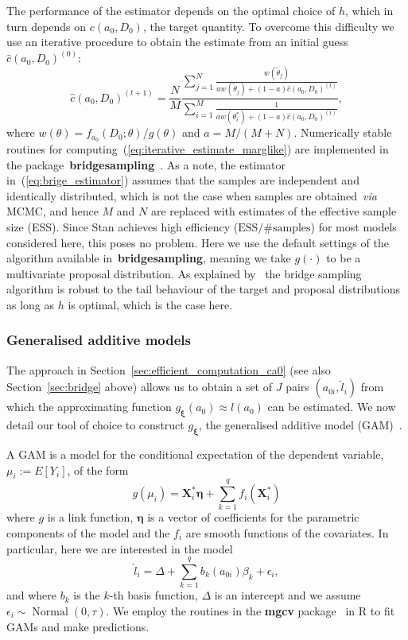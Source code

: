 \documentclass[a4paper, notitlepage, 11pt]{article}
\begin{document}
The performance of the estimator depends on the optimal choice of $h$, which in turn depends on $c(a_0, D_0)$, the target quantity.
To overcome this difficulty we use an iterative procedure to obtain the estimate from an initial guess $\hat{c}(a_0, D_0)^{(0)}$:
\begin{equation}
 \label{eq:iterative_estimate_marglike}
  \hat{c}(a_0, D_0)^{(t + 1)} = \frac{N}{M}\frac{\sum_{j=1}^N \frac{w(\tilde{\theta}_j)}{aw(\tilde{\theta}_j) + (1-a)\hat{c}(a_0, D_0)^{(t)} } }{\sum_{i=1}^M \frac{1}{aw(\theta_i^\ast) + (1-a)\hat{c}(a_0, D_0)^{(t)} }},
\end{equation}
where $w(\theta) = f_{a_0}(D_0; \theta)/g(\theta)$ and $a =  M/(M + N)$.
Numerically stable routines for computing~(\ref{eq:iterative_estimate_marglike}) are implemented in the package~\textbf{bridgesampling}~\citep{Gronau2017}.
As a note, the estimator in~(\ref{eq:brige_estimator}) assumes that the samples are independent and identically distributed, which is not the case when samples are obtained~\textit{via} MCMC, and hence $M$ and $N$ are replaced with estimates of the effective sample size (ESS).
Since Stan achieves high efficiency ($\text{ESS}/\text{\# samples}$) for most models considered here, this poses no problem.
Here we use the default settings of the algorithm available in~\textbf{bridgesampling}, meaning we take $g(\cdot)$ to be a multivariate proposal distribution.
As explained by~\cite{Gronau2017} the bridge sampling algorithm is robust to the tail behaviour of the target and proposal distributions as long as $h$ is optimal, which is the case here.

\subsubsection{Generalised additive models}
\label{sec:gam}

The approach in Section~\ref{sec:efficient_computation_ca0} (see also Section~\ref{sec:bridge} above) allows us to obtain a set of $J$ pairs $(a_{0i}, \hat{l}_i)$ from which the approximating function $g_{\boldsymbol{\xi}}(a_0) \approx l(a_0)$ can be estimated. 
We now detail our tool of choice to construct $g_{\boldsymbol{\xi}}$, the generalised additive model (GAM)~\citep{Wood2017}.

A GAM is a model for the conditional expectation of the dependent variable, $\mu_i := E[Y_i]$, of the form
\begin{equation}
 g(\mu_i) = \boldsymbol{X}_i^\ast\boldsymbol{\eta} + \sum_{k = 1}^q f_i(\boldsymbol{X}_i^\ast)
\end{equation}
where $g$ is a link function, $\boldsymbol{\eta}$ is a vector of coefficients for the parametric components of the model and the $f_i$ are smooth functions of the covariates.
In particular, here we are interested in the model
\begin{equation}
\label{eq:gam_one_smooth}
  \hat{l}_i = \Delta + \sum_{k = 1}^q b_k(a_{0i})\beta_k  + \epsilon_i,
\end{equation}
and where $b_k$ is the $k$-th basis function, $\Delta$ is an intercept and we assume $\epsilon_i\sim \operatorname{Normal}(0, \tau)$.
We employ the routines in the \textbf{mgcv} package~\citep{Wood2011} in R to fit GAMs and make predictions.
\end{document}
